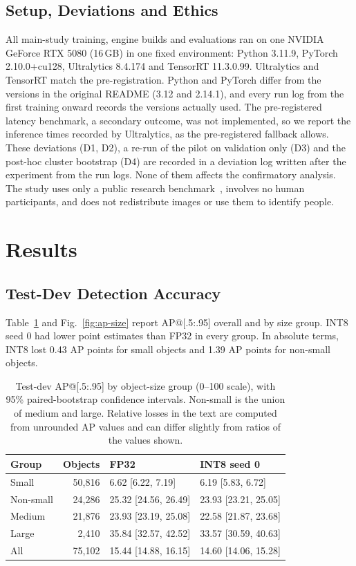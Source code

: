 \documentclass[conference]{IEEEtran}
\begin{document}
\subsection{Setup, Deviations and Ethics}
All main-study training, engine builds and evaluations ran on one NVIDIA GeForce RTX 5080
(16\,GB) in one fixed environment: Python 3.11.9, PyTorch 2.10.0+cu128, Ultralytics 8.4.174 and
TensorRT 11.3.0.99. Ultralytics and TensorRT match the pre-registration. Python and PyTorch differ
from the versions in the original README (3.12 and 2.14.1), and every run log from the first
training onward records the versions actually used. The pre-registered latency benchmark, a
secondary outcome, was not implemented, so we report the inference times recorded by
Ultralytics, as the pre-registered fallback allows. These deviations (D1, D2), a re-run of the
pilot on validation only (D3) and the post-hoc cluster bootstrap (D4) are recorded in a deviation
log written after the experiment from the run logs. None of them affects the confirmatory
analysis. The study uses
only a public research benchmark~\cite{zhu2022visdrone}, involves no human participants, and does
not redistribute images or use them to identify people.

\section{Results}
\label{sec:results}

\subsection{Test-Dev Detection Accuracy}
Table~\ref{tab:ap-results} and Fig.~\ref{fig:ap-size} report AP@[.5:.95] overall and by size
group. INT8 seed 0 had lower point estimates than FP32 in every group. In absolute terms, INT8
lost 0.43 AP points for small objects and 1.39 AP points for non-small objects.

\begin{table}[!t]
\caption{Test-dev AP@[.5:.95] by object-size group (0--100 scale), with 95\% paired-bootstrap
confidence intervals. Non-small is the union of medium and large. Relative losses in the text
are computed from unrounded AP values and can differ slightly from ratios of the values shown.}
\label{tab:ap-results}
\centering
\footnotesize
\setlength{\tabcolsep}{4pt}
\begin{tabular}{lrll}
\hline
Group & Objects & FP32 & INT8 seed 0 \\
\hline
Small     & 50,816 & 6.62 [6.22, 7.19]    & 6.19 [5.83, 6.72] \\
Non-small & 24,286 & 25.32 [24.56, 26.49] & 23.93 [23.21, 25.05] \\
Medium    & 21,876 & 23.93 [23.19, 25.08] & 22.58 [21.87, 23.68] \\
Large     & 2,410  & 35.84 [32.57, 42.52] & 33.57 [30.59, 40.63] \\
All       & 75,102 & 15.44 [14.88, 16.15] & 14.60 [14.06, 15.28] \\
\hline
\end{tabular}
\end{table}
\end{document}

